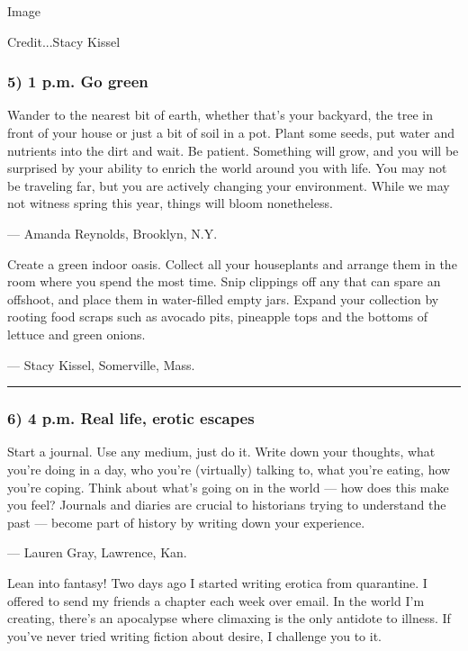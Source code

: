 Image

Credit...Stacy Kissel

\hypertarget{5-1-pm-go-green}{%
\subsubsection{\texorpdfstring{\textbf{5) 1 p.m. Go
green}}{5) 1 p.m. Go green}}\label{5-1-pm-go-green}}

Wander to the nearest bit of earth, whether that's your backyard, the
tree in front of your house or just a bit of soil in a pot. Plant some
seeds, put water and nutrients into the dirt and wait. Be patient.
Something will grow, and you will be surprised by your ability to enrich
the world around you with life. You may not be traveling far, but you
are actively changing your environment. While we may not witness spring
this year, things will bloom nonetheless.

--- Amanda Reynolds, Brooklyn, N.Y.

Create a green indoor oasis. Collect all your houseplants and arrange
them in the room where you spend the most time. Snip clippings off any
that can spare an offshoot, and place them in water-filled empty jars.
Expand your collection by rooting food scraps such as avocado pits,
pineapple tops and the bottoms of lettuce and green onions.

--- Stacy Kissel, Somerville, Mass.

\begin{center}\rule{0.5\linewidth}{\linethickness}\end{center}

\hypertarget{6-4-pm-real-life-erotic-escapes}{%
\subsubsection{\texorpdfstring{\textbf{6) 4 p.m. Real life, erotic
escapes}}{6) 4 p.m. Real life, erotic escapes}}\label{6-4-pm-real-life-erotic-escapes}}

Start a journal. Use any medium, just do it. Write down your thoughts,
what you're doing in a day, who you're (virtually) talking to, what
you're eating, how you're coping. Think about what's going on in the
world --- how does this make you feel? Journals and diaries are crucial
to historians trying to understand the past --- become part of history
by writing down your experience.

--- Lauren Gray, Lawrence, Kan.

Lean into fantasy! Two days ago I started writing erotica from
quarantine. I offered to send my friends a chapter each week over email.
In the world I'm creating, there's an apocalypse where climaxing is the
only antidote to illness. If you've never tried writing fiction about
desire, I challenge you to it.

